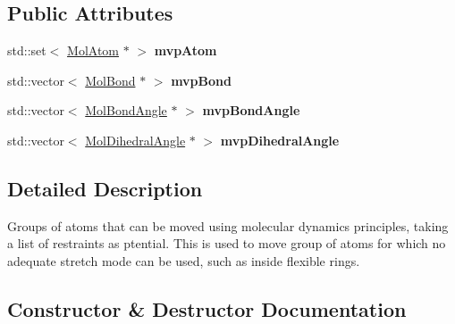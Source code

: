 \subsection*{Public Attributes}
\begin{DoxyCompactItemize}
\item 
\mbox{\label{struct_obj_cryst_1_1_m_d_atom_group_a300e382447655a3533cb830bb3c4cee3}} 
std\+::set$<$ \mbox{\hyperlink{class_obj_cryst_1_1_mol_atom}{Mol\+Atom}} $\ast$ $>$ {\bfseries mvp\+Atom}
\item 
\mbox{\label{struct_obj_cryst_1_1_m_d_atom_group_a6d16a774b6b57b964e37f890a89edac0}} 
std\+::vector$<$ \mbox{\hyperlink{class_obj_cryst_1_1_mol_bond}{Mol\+Bond}} $\ast$ $>$ {\bfseries mvp\+Bond}
\item 
\mbox{\label{struct_obj_cryst_1_1_m_d_atom_group_a68f73aaab1156d32bc79f368e237eaac}} 
std\+::vector$<$ \mbox{\hyperlink{class_obj_cryst_1_1_mol_bond_angle}{Mol\+Bond\+Angle}} $\ast$ $>$ {\bfseries mvp\+Bond\+Angle}
\item 
\mbox{\label{struct_obj_cryst_1_1_m_d_atom_group_a274d11d65f45f72eb38d83d589852bf9}} 
std\+::vector$<$ \mbox{\hyperlink{class_obj_cryst_1_1_mol_dihedral_angle}{Mol\+Dihedral\+Angle}} $\ast$ $>$ {\bfseries mvp\+Dihedral\+Angle}
\end{DoxyCompactItemize}


\subsection{Detailed Description}
Groups of atoms that can be moved using molecular dynamics principles, taking a list of restraints as ptential. This is used to move group of atoms for which no adequate stretch mode can be used, such as inside flexible rings. 

\subsection{Constructor \& Destructor Documentation}
\mbox{\label{struct_obj_cryst_1_1_m_d_atom_group_a86dd6c6277666fa607685736bdffbedc}} 
